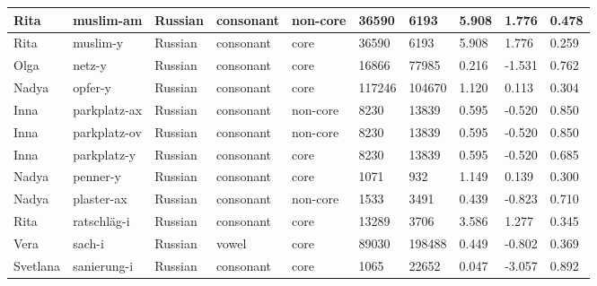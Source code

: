 \begin{longtable}{|p{1.2cm}|p{3cm}|p{1cm}|p{1.5cm}|p{1.5cm}|R{1.2cm}|R{1cm}|R{1cm}|R{0.8cm}|R{0.8cm}|}
Rita      & muslim-am              & Russian       & consonant        & non-core  & 36590        & 6193           & 5.908                 & 1.776             & 0.478        \\ \hline
Rita      & muslim-y               & Russian       & consonant        & core      & 36590        & 6193           & 5.908                 & 1.776             & 0.259        \\ \hline
Olga      & netz-y                 & Russian       & consonant        & core      & 16866        & 77985          & 0.216                 & -1.531            & 0.762        \\ \hline
Nadya     & opfer-y                & Russian       & consonant        & core      & 117246       & 104670         & 1.120                 & 0.113             & 0.304        \\ \hline
Inna      & parkplatz-ax           & Russian       & consonant        & non-core  & 8230         & 13839          & 0.595                 & -0.520            & 0.850        \\ \hline
Inna      & parkplatz-ov           & Russian       & consonant        & non-core  & 8230         & 13839          & 0.595                 & -0.520            & 0.850        \\ \hline
Inna      & parkplatz-y            & Russian       & consonant        & core      & 8230         & 13839          & 0.595                 & -0.520            & 0.685        \\ \hline
Nadya     & penner-y               & Russian       & consonant        & core      & 1071         & 932            & 1.149                 & 0.139             & 0.300        \\ \hline
Nadya     & plaster-ax             & Russian       & consonant        & non-core  & 1533         & 3491           & 0.439                 & -0.823            & 0.710        \\ \hline
Rita      & ratschl\"{a}g-i        & Russian       & consonant        & core      & 13289        & 3706           & 3.586                 & 1.277             & 0.345        \\ \hline
Vera      & sach-i                 & Russian       & vowel            & core      & 89030        & 198488         & 0.449                 & -0.802            & 0.369        \\ \hline
Svetlana  & sanierung-i            & Russian       & consonant        & core      & 1065         & 22652          & 0.047                 & -3.057            & 0.892        \\ \hline

\end{longtable}
